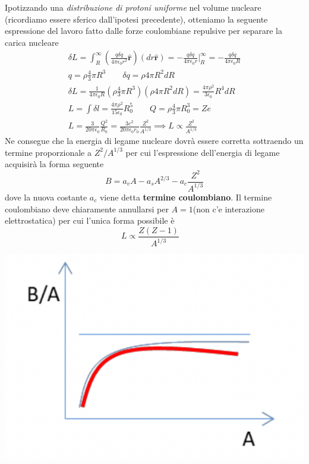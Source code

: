Ipotizzando una \emph{distribuzione di protoni uniforme} nel volume
nucleare (ricordiamo essere sferico dall'ipotesi precedente), otteniamo
la seguente espressione del lavoro fatto dalle forze coulombiane
repulsive per separare la carica nucleare
\begin{gather*}
	\delta L = \int _{R}^{\infty} \left( \frac{q \delta q}{4 \pi \epsilon_{0}r^{2}}  \hat{\bm{r}} \right)(dr \hat{\bm{r}})=
	- \frac{q \delta q}{4 \pi \epsilon_{0}r} \bigg |_{R}^{\infty} =
	- \frac{q \delta q}{4 \pi \epsilon_{0}R}\\
	q = \rho \frac{ 4}{3} \pi R^{3} \qquad \delta q = \rho 4 \pi R^{2} dR\\
	\delta L = \frac{1}{4 \pi \epsilon_{0}R}\left( \rho \frac{ 4}{3}\pi R^{3} \right)(\rho 4 \pi R^{2} dR) = \frac{4 \pi \rho^{2}}{3 \epsilon_{0}}R^{4}dR\\
	L = \int \delta l = \frac{4 \pi \rho^{2}}{15 \epsilon_{0}}R_{0}^{5} \qquad Q = \rho \frac{ 4}{3} \pi R_{0}^{3} = Ze\\
	L = \frac{3}{20 \pi \epsilon_{0}} \frac{Q^{2}}{R_{0}} = \frac{3e^{2}}{20 \pi \epsilon_{0}r_{0}} \frac{Z^{2}}{A^{1/3}}
	\implies L \propto \frac{ Z^{2}}{A^{1/3}}
\end{gather*} Ne consegue che la energia di legame nucleare dovrà essere corretta
sottraendo un termine proporzionale a \(Z^{2} / A^{1/3}\) per cui
l'espressione dell'energia di legame acquisirà la forma seguente
\begin{equation}
	B = a_{v}A - a_{s}A^{2/3} - a_{c} \frac{Z^{2}}{A^{1/3}}
	\label{eq:coulomb-term-drop-model}
\end{equation}
 dove la nuova costante \(a_{c}\) viene detta \textbf{termine
	coulombiano}.
Il termine coulombiano deve chiaramente annullarsi per
\(A=1\)(non c'e interazione elettrostatica) per cui l'unica forma
possibile è \[
	L \propto \frac{Z(Z-1)}{A^{1/3}} \quad
\]
\begin{marginfigure}
	\includegraphics{figs/goccia3}
	\label{fig:goccia3}
\end{marginfigure}

